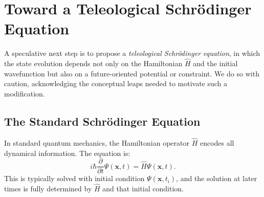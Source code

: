 \documentclass[11pt]{article}
\begin{document}
\section{Toward a Teleological Schr\"odinger Equation}
\label{sec:teleological-schrodinger}
A speculative next step is to propose a \emph{teleological Schr\"odinger equation}, in which the state evolution depends not only on the Hamiltonian $\hat{H}$ and the initial wavefunction but also on a future-oriented potential or constraint. We do so with caution, acknowledging the conceptual leaps needed to motivate such a modification.

\subsection{The Standard Schr\"odinger Equation}
In standard quantum mechanics, the Hamiltonian operator $\hat{H}$ encodes all dynamical information. The equation is:
\begin{equation}
    i \hbar \frac{\partial}{\partial t} \Psi(\mathbf{x}, t)
    = \hat{H} \Psi(\mathbf{x}, t).
    \label{eq:standard-schrodinger}
\end{equation}
This is typically solved with initial condition $\Psi(\mathbf{x}, t_i)$, and the solution at later times is fully determined by $\hat{H}$ and that initial condition.
\end{document}
